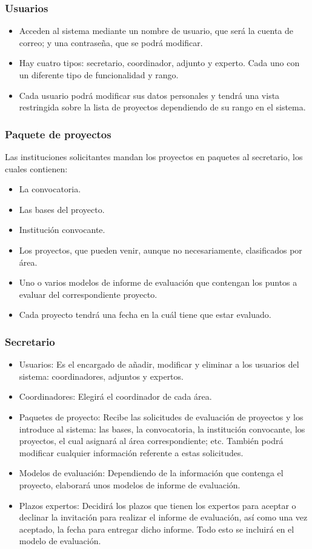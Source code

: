 \documentclass[12pt,a4paper,spanish,twoside]{article}
\begin{document}
\subsubsection{Usuarios}
\begin{itemize}
\item Acceden al sistema mediante un nombre de usuario, que será la cuenta de
  correo; y una contraseña, que se podrá modificar.
\item Hay cuatro tipos: secretario, coordinador, adjunto y experto. Cada uno
  con un diferente tipo de funcionalidad y rango. 
\item Cada usuario podrá modificar sus datos personales y tendrá una vista
  restringida sobre la lista de proyectos dependiendo de su rango en el 
  sistema.
\end{itemize}

\subsubsection{Paquete de proyectos}
Las instituciones solicitantes mandan los proyectos en paquetes al
secretario, los cuales contienen: 
\begin{itemize}
\item La convocatoria.
\item Las bases del proyecto.
\item Institución convocante.
\item Los proyectos, que pueden venir, aunque no necesariamente, clasificados
  por área. 
\item Uno o varios modelos de informe de evaluación que contengan los puntos
  a evaluar del correspondiente proyecto. 
\item Cada proyecto tendrá una fecha en la cuál tiene que estar evaluado.
\end{itemize}

\subsubsection{Secretario}
\begin{itemize}
\item Usuarios: Es el encargado de añadir, modificar y eliminar a los
  usuarios del sistema: coordinadores, adjuntos y expertos.
\item Coordinadores: Elegirá el coordinador de cada área.
\item Paquetes de proyecto: Recibe las solicitudes de evaluación de proyectos
  y los introduce al sistema: las bases, la convocatoria, la institución
  convocante, los proyectos, el cual asignará al área correspondiente;
  etc. También podrá modificar cualquier información referente a estas
  solicitudes. 
\item Modelos de evaluación: Dependiendo de la información que contenga el
  proyecto, elaborará unos modelos de informe de evaluación. 
\item Plazos expertos: Decidirá los plazos que tienen los expertos para
  aceptar o declinar la invitación para realizar el informe de evaluación,
  así como una vez aceptado, la fecha para entregar dicho informe. Todo esto
  se incluirá en el modelo de evaluación.
\end{itemize}
\end{document}
